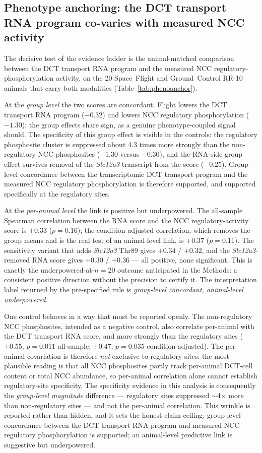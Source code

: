 \documentclass[11pt]{article}
\newcommand{\gene}[1]{\textit{#1}}
\begin{document}
\subsection{Phenotype anchoring: the DCT transport RNA program co-varies with measured NCC activity}

The decisive test of the evidence ladder is the animal-matched comparison between the DCT transport RNA program and the measured NCC regulatory-phosphorylation activity, on the 20 Space~Flight and Ground~Control RR-10 animals that carry both modalities (Table~\ref{tab:phenoanchor}).

At the \emph{group level} the two scores are concordant. Flight lowers the DCT transport RNA program ($-0.32$) and lowers NCC regulatory phosphorylation ($-1.30$); the group effects share sign, as a genuine phenotype-coupled signal should. The specificity of this group effect is visible in the controls: the regulatory phosphosite cluster is suppressed about 4.3 times more strongly than the non-regulatory NCC phosphosites ($-1.30$ versus $-0.30$), and the RNA-side group effect survives removal of the \gene{Slc12a3} transcript from the score ($-0.25$). Group-level concordance between the transcriptomic DCT transport program and the measured NCC regulatory phosphorylation is therefore supported, and supported specifically at the regulatory sites.

At the \emph{per-animal level} the link is positive but underpowered. The all-sample Spearman correlation between the RNA score and the NCC regulatory-activity score is $+0.33$ ($p=0.16$); the condition-adjusted correlation, which removes the group means and is the real test of an animal-level link, is $+0.37$ ($p=0.11$). The sensitivity variant that adds \gene{Slc12a3} Thr89 gives $+0.34$ / $+0.32$, and the \gene{Slc12a3}-removed RNA score gives $+0.30$ / $+0.36$ --- all positive, none significant. This is exactly the underpowered-at-$n=20$ outcome anticipated in the Methods: a consistent positive direction without the precision to certify it. The interpretation label returned by the pre-specified rule is \emph{group-level concordant, animal-level underpowered}.

One control behaves in a way that must be reported openly. The non-regulatory NCC phosphosites, intended as a negative control, also correlate per-animal with the DCT transport RNA score, and more strongly than the regulatory sites ($+0.55$, $p=0.011$ all-sample; $+0.47$, $p=0.035$ condition-adjusted). The per-animal covariation is therefore \emph{not} exclusive to regulatory sites: the most plausible reading is that all NCC phosphosites partly track per-animal DCT-cell content or total NCC abundance, so per-animal correlation alone cannot establish regulatory-site specificity. The specificity evidence in this analysis is consequently the \emph{group-level magnitude} difference --- regulatory sites suppressed $\sim$4$\times$ more than non-regulatory sites --- and not the per-animal correlation. This wrinkle is reported rather than hidden, and it sets the honest claim ceiling: group-level concordance between the DCT transport RNA program and measured NCC regulatory phosphorylation is supported; an animal-level predictive link is suggestive but underpowered.
\end{document}
